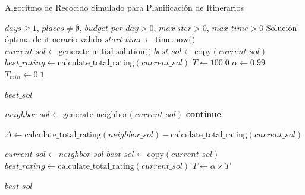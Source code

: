 \documentclass[10pt]{llncs}
\begin{document}
\begin{algorithm}
\caption{Algoritmo de Recocido Simulado para Planificación de Itinerarios}
\label{alg:recocido_viajes}
\begin{algorithmic}[1]
\Require $days \geq 1$, $places \neq \emptyset$, $budget\_per\_day > 0$, $max\_iter > 0$, $max\_time > 0$
\Ensure Solución óptima de itinerario válido
\Statex
{}
\State $start\_time \gets \text{time.now()}$
\State $current\_sol \gets \text{generate\_initial\_solution()}$ 
\State $best\_sol \gets \text{copy}(current\_sol)$
\State $best\_rating \gets \text{calculate\_total\_rating}(current\_sol)$
\State $T \gets 100.0$ 
\State $\alpha \gets 0.99$ 
\State $T_{min} \gets 0.1$ 

            \State \Return $best\_sol$ 
        \EndIf
        
        \State $neighbor\_sol \gets \text{generate\_neighbor}(current\_sol)$
            \State \textbf{continue} 
        \EndIf
        
        \State $\Delta \gets \text{calculate\_total\_rating}(neighbor\_sol) - \text{calculate\_total\_rating}(current\_sol)$
        
            \State $current\_sol \gets neighbor\_sol$
                \State $best\_sol \gets \text{copy}(current\_sol)$
                \State $best\_rating \gets \text{calculate\_total\_rating}(current\_sol)$
            \EndIf
        \EndIf
    \EndFor
    \State $T \gets \alpha \times T$ 
\EndWhile

\State \Return $best\_sol$
\EndFunction
\end{algorithmic}
\end{algorithm}
\end{document}
